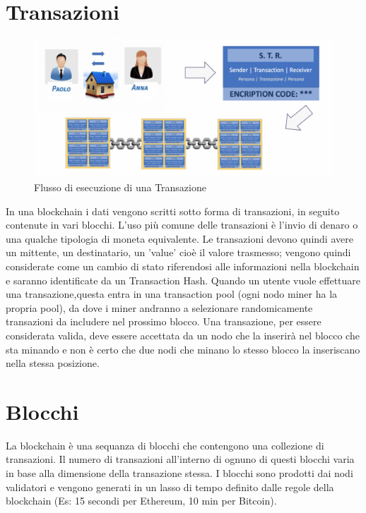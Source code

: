 \documentclass[11pt,a4paper,titlepage,twoside,openright]{report}
\begin{document}
\section{Transazioni}

\begin{figure}[h]
	\includegraphics[width=\textwidth]{flusso_bc}
	\centering
	\caption{Flusso di esecuzione di una Transazione}
	\label{fig:fl_bc}
\end{figure}

In una blockchain i dati vengono scritti sotto forma di transazioni, in seguito contenute in vari blocchi. L'uso più comune delle transazioni è l'invio di denaro o una qualche tipologia di moneta equivalente. Le transazioni devono quindi avere un mittente, un destinatario, un 'value' cioè il valore trasmesso; vengono quindi considerate come un cambio di stato riferendosi alle informazioni nella blockchain e saranno identificate da un Transaction Hash. Quando un utente vuole effettuare una transazione,questa entra in una transaction pool (ogni nodo miner ha la propria pool), da dove i miner andranno a selezionare randomicamente transazioni da includere nel prossimo blocco. Una transazione, per essere considerata valida, deve essere accettata da un nodo che la inserirà nel blocco che sta minando e non è certo che due nodi che minano lo stesso blocco la inseriscano nella stessa posizione.

\section{Blocchi}
La blockchain è una sequanza di blocchi che contengono una collezione di transazioni. Il numero di transazioni all'interno di ognuno di questi blocchi varia in base alla dimensione della transazione stessa. I blocchi sono prodotti dai nodi validatori e vengono generati in un lasso di tempo definito dalle regole della blockchain (Es: 15 secondi per Ethereum, 10 min per Bitcoin).
\end{document}
